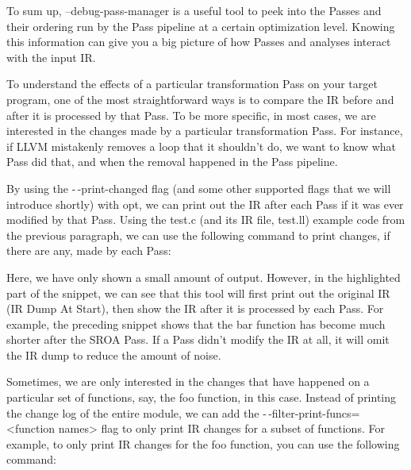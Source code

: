 To sum up, --debug-pass-manager is a useful tool to peek into the Passes and their ordering run by the Pass pipeline at a certain optimization level. Knowing this information can give you a big picture of how Passes and analyses interact with the input IR.


To understand the effects of a particular transformation Pass on your target program, one of the most straightforward ways is to compare the IR before and after it is processed by that Pass. To be more specific, in most cases, we are interested in the changes made by a particular transformation Pass. For instance, if LLVM mistakenly removes a loop that it shouldn't do, we want to know what Pass did that, and when the removal happened in the Pass pipeline.

By using the -\,-print-changed flag (and some other supported flags that we will introduce shortly) with opt, we can print out the IR after each Pass if it was ever modified by that Pass. Using the test.c (and its IR file, test.ll) example code from the previous paragraph, we can use the following command to print changes, if there are any, made by each Pass:


Here, we have only shown a small amount of output. However, in the highlighted part of the snippet, we can see that this tool will first print out the original IR (IR Dump At Start), then show the IR after it is processed by each Pass. For example, the preceding snippet shows that the bar function has become much shorter after the SROA Pass. If a Pass didn't modify the IR at all, it will omit the IR dump to reduce the amount of noise.

Sometimes, we are only interested in the changes that have happened on a particular set of functions, say, the foo function, in this case. Instead of printing the change log of the entire module, we can add the -\,-filter-print-funcs=<function names> flag to only print IR changes for a subset of functions. For example, to only print IR changes for the foo function, you can use the following command:

